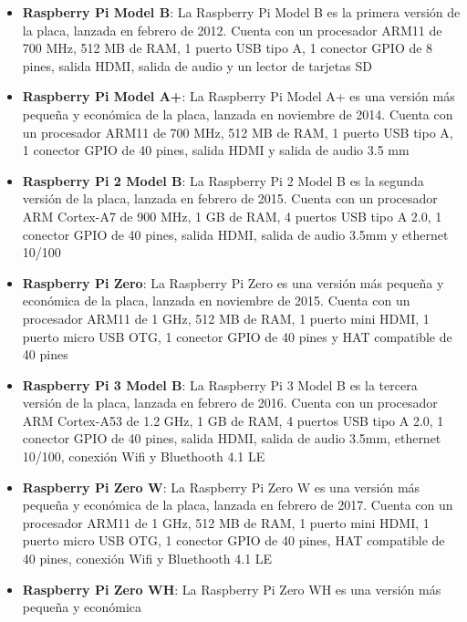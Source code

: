     \begin{itemize}
        \item \textbf{Raspberry Pi Model B}: La Raspberry Pi Model B es la primera versi\'on de la placa, 
            lanzada en febrero de 2012. Cuenta con un procesador ARM11 de 700 MHz, 512 MB de RAM, 
            1 puerto USB tipo A, 1 conector GPIO de 8 pines, salida HDMI, salida de audio y un lector de tarjetas SD \cite{Santamaria2023}
        \item \textbf{Raspberry Pi Model A+}: La Raspberry Pi Model A+ es una versi\'on m\'as peque\~na y 
            econ\'omica de la placa, lanzada en noviembre de 2014. Cuenta con un procesador ARM11 de 700 MHz, 
            512 MB de RAM, 1 puerto USB tipo A, 1 conector GPIO de 40 pines, salida HDMI y salida de audio 3.5 mm \cite{Santamaria2023}
        \item \textbf{Raspberry Pi 2 Model B}: La Raspberry Pi 2 Model B es la segunda versi\'on de la placa, 
            lanzada en febrero de 2015. Cuenta con un procesador ARM Cortex-A7 de 900 MHz, 1 GB de RAM, 
            4 puertos USB tipo A 2.0, 1 conector GPIO de 40 pines, salida HDMI, salida de audio 3.5mm y ethernet 10/100 \cite{Santamaria2023}
        \item \textbf{Raspberry Pi Zero}: La Raspberry Pi Zero es una versi\'on m\'as peque\~na y econ\'omica 
            de la placa, lanzada en noviembre de 2015. Cuenta con un procesador ARM11 de 1 GHz, 512 MB de RAM, 
            1 puerto mini HDMI, 1 puerto micro USB OTG, 1 conector GPIO de 40 pines y HAT compatible de 40 pines \cite{Santamaria2023} 
        \item \textbf{Raspberry Pi 3 Model B}: La Raspberry Pi 3 Model B es la tercera versi\'on de la placa, 
            lanzada en febrero de 2016. Cuenta con un procesador ARM Cortex-A53 de 1.2 GHz, 1 GB de RAM, 
            4 puertos USB tipo A 2.0, 1 conector GPIO de 40 pines, salida HDMI, salida de audio 3.5mm, ethernet 10/100, 
            conexi\'on Wifi y Bluethooth 4.1 LE \cite{Santamaria2023}
        \item \textbf{Raspberry Pi Zero W}: La Raspberry Pi Zero W es una versi\'on m\'as peque\~na y econ\'omica 
            de la placa, lanzada en febrero de 2017. Cuenta con un procesador ARM11 de 1 GHz, 512 MB de RAM, 
            1 puerto mini HDMI, 1 puerto micro USB OTG, 1 conector GPIO de 40 pines, HAT compatible de 40 pines, 
            conexi\'on Wifi y Bluethooth 4.1 LE \cite{Santamaria2023}
        \item \textbf{Raspberry Pi Zero WH}: La Raspberry Pi Zero WH es una versi\'on m\'as peque\~na y econ\'omica 

\end{itemize}
